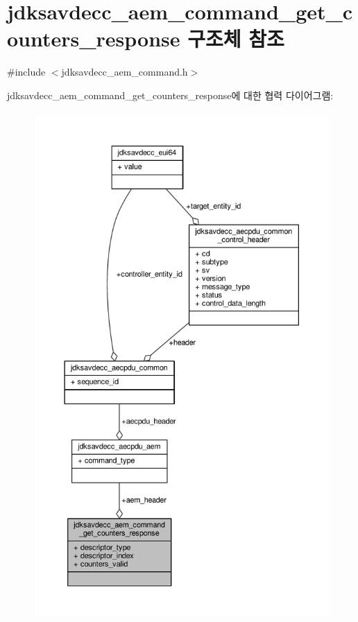 \hypertarget{structjdksavdecc__aem__command__get__counters__response}{}\section{jdksavdecc\+\_\+aem\+\_\+command\+\_\+get\+\_\+counters\+\_\+response 구조체 참조}
\label{structjdksavdecc__aem__command__get__counters__response}


{\ttfamily \#include $<$jdksavdecc\+\_\+aem\+\_\+command.\+h$>$}



jdksavdecc\+\_\+aem\+\_\+command\+\_\+get\+\_\+counters\+\_\+response에 대한 협력 다이어그램\+:
\nopagebreak
\begin{figure}[H]
\begin{center}
\leavevmode
\includegraphics[height=550pt]{structjdksavdecc__aem__command__get__counters__response__coll__graph}
\end{center}
\end{figure}
